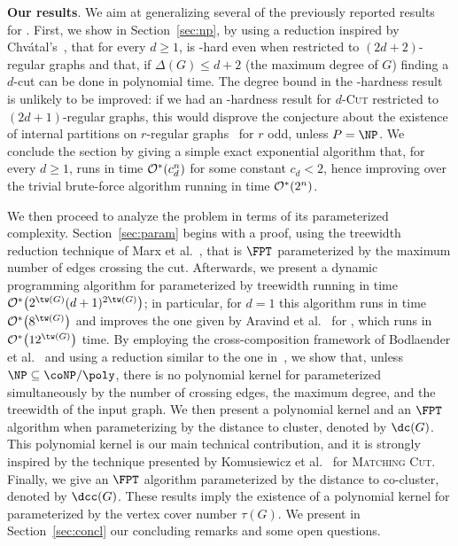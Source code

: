 \noindent \textbf{Our results}. We aim at generalizing several of the previously reported results  for .
First, we show in Section~\ref{sec:np}, by using a reduction inspired by Chvátal's~\cite{chvatal_matching_cut}, that for every $d \geq 1$,  is \NP-hard even when restricted to $(2d+2)$-regular graphs and that, if $\Delta(G) \leq d+2$ (the maximum degree of $G$) finding a $d$-cut can be done in polynomial time. The degree bound in the \NP-hardness result is unlikely to be improved: if we had an \NP-hardness result for \textsc{$d$-Cut} restricted to $(2d+1)$-regular graphs, this would disprove the conjecture about the existence of internal partitions on $r$-regular graphs~\cite{DeVos09,internal_partition_regular6,internal_partition_regular3_4} for $r$ odd, unless $P = \NP$. We conclude the section by giving a simple exact exponential algorithm that,  for every $d \geq 1$, runs in time $\mathcal{O}^*\!\left(c_d^n\right)$ for some constant $c_d < 2$, hence improving over the trivial brute-force algorithm running in time $\mathcal{O}^*\!\left(2^n\right)$.

We then proceed to analyze the problem in terms of its parameterized complexity.
Section~\ref{sec:param} begins with a proof, using the treewidth reduction technique of Marx et al.~\cite{marx_treewidth_reduction}, that  is $\FPT$ parameterized by the maximum number of edges crossing the cut.
Afterwards, we present a dynamic programming algorithm for  parameterized by treewidth running in time $\bigOs{2^{\tw(G)}(d+1)^{2\tw(G)}}$; in particular, for $d=1$ this algorithm runs in time $\bigOs{8^{\tw(G)}}$ and improves the one given by Aravind et al.~\cite{matching_cut_structural} for , which runs in $\bigOs{12^{\tw(G)}}$ time.
By employing the cross-composition framework of Bodlaender et al.~\cite{cross_composition} and using a reduction similar to the one in~\cite{matching_cut_ipec}, we show that, unless $\NP \subseteq \coNP/\poly$, there is no polynomial kernel for  parameterized simultaneously by the number of crossing edges, the maximum degree, and the treewidth of the input graph.
We then present a polynomial kernel and an $\FPT$ algorithm when parameterizing by the distance to cluster, denoted by $\dc(G)$. This polynomial kernel is our main technical contribution, and it is strongly inspired by the technique presented by  Komusiewicz et al.~\cite{matching_cut_ipec} for \textsc{Matching Cut}. Finally, we give an $\FPT$ algorithm parameterized by the distance to co-cluster, denoted by $\dcc(G)$.
These results imply the existence of a polynomial kernel for  parameterized by the vertex cover number $\tau(G)$.
We present in Section~\ref{sec:concl} our concluding remarks and some open questions.


